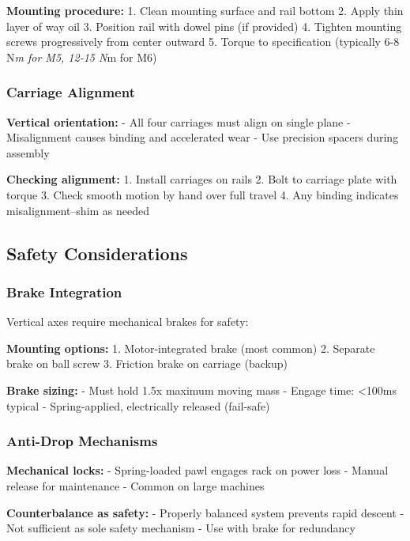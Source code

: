 \documentclass[
]{article}
\begin{document}
\textbf{Mounting procedure:} 1. Clean mounting surface and rail bottom
2. Apply thin layer of way oil 3. Position rail with dowel pins (if
provided) 4. Tighten mounting screws progressively from center outward
5. Torque to specification (typically 6-8 N\emph{m for M5, 12-15 N}m for
M6)

\subsubsection{Carriage Alignment}\label{carriage-alignment}

\textbf{Vertical orientation:} - All four carriages must align on single
plane - Misalignment causes binding and accelerated wear - Use precision
spacers during assembly

\textbf{Checking alignment:} 1. Install carriages on rails 2. Bolt to
carriage plate with torque 3. Check smooth motion by hand over full
travel 4. Any binding indicates misalignment--shim as needed

\subsection{Safety Considerations}\label{safety-considerations}

\subsubsection{Brake Integration}\label{brake-integration}

Vertical axes require mechanical brakes for safety:

\textbf{Mounting options:} 1. Motor-integrated brake (most common) 2.
Separate brake on ball screw 3. Friction brake on carriage (backup)

\textbf{Brake sizing:} - Must hold 1.5x maximum moving mass - Engage
time: \textless100ms typical - Spring-applied, electrically released
(fail-safe)

\subsubsection{Anti-Drop Mechanisms}\label{anti-drop-mechanisms}

\textbf{Mechanical locks:} - Spring-loaded pawl engages rack on power
loss - Manual release for maintenance - Common on large machines

\textbf{Counterbalance as safety:} - Properly balanced system prevents
rapid descent - Not sufficient as sole safety mechanism - Use with brake
for redundancy
\end{document}
